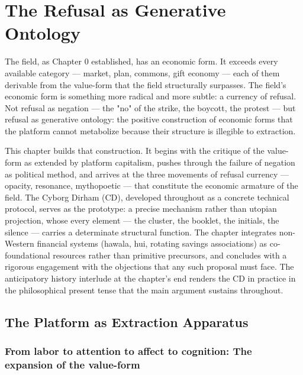 \chapter{The Refusal as Generative Ontology}
\label{ch:01}

The field, as Chapter 0 established, has an economic form. It exceeds every available category — market, plan, commons, gift economy — each of them derivable from the value-form that the field structurally surpasses. The field's economic form is something more radical and more subtle: a currency of refusal. Not refusal as negation — the "no" of the strike, the boycott, the protest — but refusal as generative ontology: the positive construction of economic forms that the platform cannot metabolize because their structure is illegible to extraction.

This chapter builds that construction. It begins with the critique of the value-form as extended by platform capitalism, pushes through the failure of negation as political method, and arrives at the three movements of refusal currency — opacity, resonance, mythopoetic — that constitute the economic armature of the field. The Cyborg Dirham (CD), developed throughout as a concrete technical protocol, serves as the prototype: a precise mechanism rather than utopian projection, whose every element — the cluster, the booklet, the initials, the silence — carries a determinate structural function. The chapter integrates non-Western financial systems (hawala, hui, rotating savings associations) as co-foundational resources rather than primitive precursors, and concludes with a rigorous engagement with the objections that any such proposal must face. The anticipatory history interlude at the chapter's end renders the CD in practice in the philosophical present tense that the main argument sustains throughout.

\section{The Platform as Extraction Apparatus}

\subsection{From labor to attention to affect to cognition: The expansion of the value-form}

